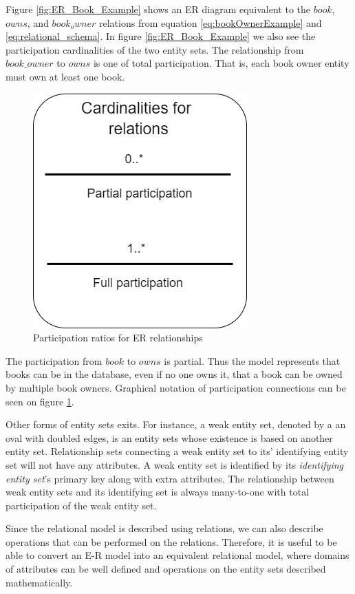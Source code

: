 Figure \ref{fig:ER_Book_Example} shows an ER diagram equivalent to the $book$, $owns$, and $book_owner$ relations from equation \ref{eq:bookOwnerExample} and \ref{eq:relational_schema}.
In figure \ref{fig:ER_Book_Example} we also see the participation cardinalities of the two entity sets. 
The relationship from $book\_owner$ to $owns$ is one of total participation. That is, each book owner entity must own at least one book.
\begin{figure}[h]
    \centering
    \includegraphics[scale=0.5]{Images/cardinalities.png}
    \caption{Participation ratios for ER relationships}
    \label{fig:ERDiagram_Cardinality}
\end{figure}
The participation from $book$ to $owns$ is partial. Thus the model represents that books can be in the database, even if no one owns it, that a book can be owned by multiple book owners.
Graphical notation of participation connections can be seen on figure \ref{fig:ERDiagram_Cardinality}.


Other forms of entity sets exits. For instance, a weak entity set, denoted by a an oval with doubled edges, is an entity sets whose existence is based on another entity set. Relationship sets connecting a weak entity set to its' identifying entity set will not have any attributes.
A weak entity set is identified by its \textit{identifying entity set}'s primary key along with extra attributes. 
The relationship between weak entity sets and its identifying set is always many-to-one with total  participation of the weak entity set.

Since the relational model is described using relations, we can also describe operations that can be performed on the relations.
Therefore, it is useful to be able to convert an E-R model into an equivalent relational model, where domains of attributes can be well defined and operations on the entity sets described mathematically.


